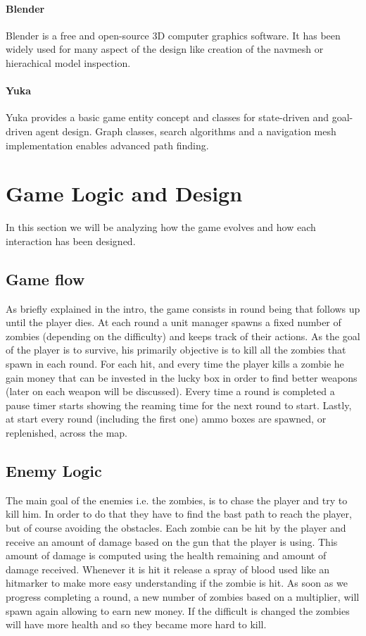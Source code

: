 \documentclass[12pt,a4paper,oneside]{article}
\theoremstyle{definition}
\begin{document}
\paragraph{Blender} 
Blender is a free and open-source 3D computer graphics software. It has been widely used for many aspect of the design like creation of the navmesh or hierachical model inspection.

\paragraph{Yuka}
Yuka provides a basic game entity concept and classes for state-driven and goal-driven agent design.
Graph classes, search algorithms and a navigation mesh implementation enables advanced path finding.
\section{Game Logic and Design}

In this section we will be analyzing how the game evolves and how each interaction has been designed.

\subsection{Game flow}

As briefly explained in the intro, the game consists in round being that follows up until the player dies. At each round a unit manager spawns a fixed number of zombies (depending on the difficulty) and keeps track of their actions. As the goal of the player is to survive, his primarily objective is to kill all the zombies that spawn in each round. For each hit, and every time the player kills a zombie he gain money that can be invested in the lucky box in order to find better weapons (later on each weapon will be discussed). Every time a round is completed a pause timer starts showing the reaming time for the next round to start. Lastly, at start every round (including the first one) ammo boxes are spawned, or replenished, across the map.

\subsection{Enemy Logic}
The main goal of the enemies i.e. the zombies, is to chase the player and try to kill him. In order to do that they have to find the bast path to reach the player, but of course avoiding the obstacles. Each zombie can be hit by the player and receive an amount of damage based on the gun that the player is using. This amount of damage is computed using the health remaining and amount of damage received. Whenever it is hit it release a spray of blood used like an hitmarker to make more easy understanding if the zombie is hit. As soon as we progress completing a round, a new number of zombies based on a multiplier, will spawn again allowing to earn new money.
If the difficult is changed the zombies will have more health and so they became more hard to kill.
\end{document}
